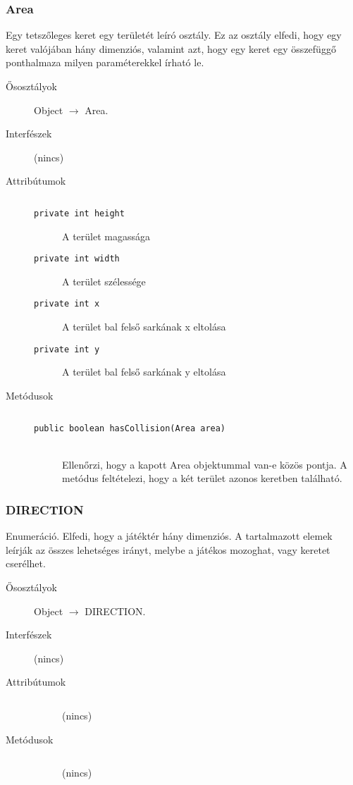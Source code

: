 		\subsubsection{Area}
				 Egy tetszőleges keret egy területét leíró osztály.  Ez az osztály elfedi, hogy egy keret valójában hány dimenziós,  valamint azt, hogy egy keret egy összefüggő ponthalmaza milyen   paraméterekkel írható le. 			\begin{description}


				\item[Ősosztályok] Object $\rightarrow{}$ Area.
				\item[Interfészek] (nincs)
				\item[Attribútumok]$\ $
					\begin{description}
						\item[\texttt{private int height}] A terület magassága 
						\item[\texttt{private int width}] A terület szélessége 
						\item[\texttt{private int x}] A terület bal felső sarkának x eltolása 
						\item[\texttt{private int y}] A terület bal felső sarkának y eltolása 
					\end{description}
				\item[Metódusok]$\ $
					\begin{description}
						\item[\texttt{public boolean hasCollision(Area area)}] \hfill \\ Ellenőrzi, hogy a kapott Area objektummal van-e közös pontja.  A metódus feltételezi, hogy a két terület azonos keretben található.
					\end{description}
			\end{description}

		\subsubsection{DIRECTION}
				 Enumeráció. Elfedi, hogy a játéktér hány dimenziós.  A tartalmazott elemek leírják az összes lehetséges irányt,   melybe a játékos mozoghat, vagy keretet cserélhet.  			\begin{description}


				\item[Ősosztályok] Object $\rightarrow{}$ DIRECTION.
				\item[Interfészek] (nincs)
				\item[Attribútumok]$\ $
					\begin{description}
						\item[] (nincs)
					\end{description}
				\item[Metódusok]$\ $
					\begin{description}
						\item[] (nincs)
					\end{description}
			\end{description}

